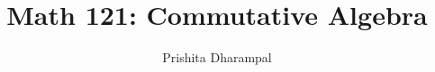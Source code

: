 \title{Math 121: Commutative Algebra}

\author{Prishita Dharampal}
\date{}
\maketitle
\vspace{-0.3in}
